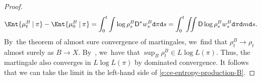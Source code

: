 \documentclass[JEP,XML,SOM,Unicode,published]{cedram}
\theoremstyle{definition}
\theoremstyle{remark}
\newcommand{\given}[1][]{%
\nonscript\:#1\vert
\allowbreak
\nonscript\:
\mathopen{}}
\begin{document}
\begin{proof}
\begin{equation}\label{e:ce-entropy-production-B}
\Ent{ \mu_{t}^{B} \given \pi } - \Ent{ \mu_{0}^{B} \given \pi } = \int_{0}^{t} \int \log \rho^{B}_{s} \mathsf{D}^{\star} w^{B}_{s} \mathtt{d} \pi \mathtt{d} s = \int _{0}^{t} \iint \mathsf{D} \log \rho^{B}_{s} w^{B}_{s} \mathtt{d} \pi \mathtt{d} m \mathtt{d} s.
\end{equation}
By~the theorem of almost sure convergence of martingales, we~find that $\rho^{B}_{t} \to \rho_{t}$ almost surely as $B \to X$.
By~\cite[Eq.\,103.1, p.\,186]{DellacherieMeyerMartingales}, we~have that $\sup_{B} \rho^{B}_{t} \in L \log L(\pi)$.
Thus, the martingale also converges in $L \log L(\pi)$ by dominated convergence.
It follows that we can take the limit in the left-hand side of \cref{e:ce-entropy-production-B}.


\end{proof}
\end{document}
